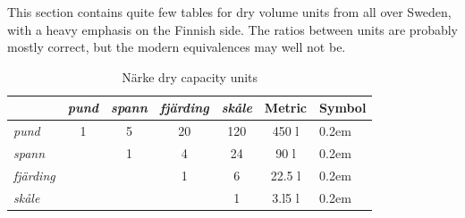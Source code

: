 \documentclass[a4paper]{article}
\newcommand{\samplefont}{\fontsize{16}{16}\abcursivefamily\spaceskip0.2em}
\newcommand{\sample}[1]{{\samplefont #1 \strut}}
\begin{document}
This section contains quite few tables for dry volume units from all
over Sweden, with a heavy emphasis on the Finnish side. The ratios
between units are probably mostly correct, but the modern equivalences
may well not be.

\begin{table}
\begin{tabular}{lcccc|cl}
  & \emph{pund} & \emph{spann}  & \emph{fjärding} & \emph{skåle} &  Metric &  Symbol \\
  \hline

  \emph{pund}      & 1 & 5 & 20 & 120 & 450 l & \sample{\abpund} \\
  \emph{spann}     &   & 1 & 4  & 24  & 90 l   & \sample{\abspann} \\
  \emph{fjärding}  &   &   & 1  &  6  & 22.5 l & \sample{\abfjarding} \\
  \emph{skåle}     &   &   &    &  1  & 3.l5 l & \sample{\abskole}  \\
\end{tabular}
  \caption{Närke dry capacity units}
  \label{tab:narke_volume}
\end{table}
\end{document}
